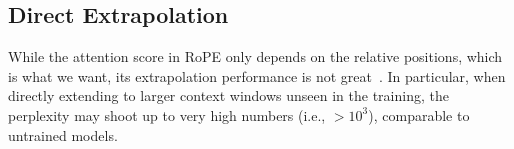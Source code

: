 \documentclass{article} %
\theoremstyle{definition}
\begin{document}

\subsection{Direct Extrapolation} 
While the attention score in RoPE only depends on the relative positions, which is what we want, its extrapolation performance is not great~\cite{}. In particular, when directly extending to larger context windows unseen in the training, the perplexity may shoot up to very high numbers (i.e., $>10^3$), comparable to untrained models.  
\end{document}
